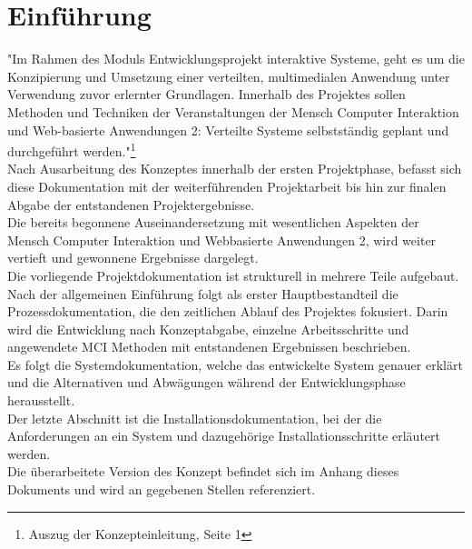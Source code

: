 
\chapter{Einführung}
"Im Rahmen des Moduls Entwicklungsprojekt interaktive Systeme, geht es um die Konzipierung und Umsetzung einer verteilten, multimedialen Anwendung unter Verwendung zuvor erlernter Grundlagen. Innerhalb des Projektes sollen Methoden und Techniken der Veranstaltungen der Mensch Computer Interaktion und Web-basierte Anwendungen 2: Verteilte Systeme selbstständig geplant und durchgeführt werden."\footnote{Auszug der Konzepteinleitung, Seite 1}\\

Nach Ausarbeitung des Konzeptes innerhalb der ersten Projektphase, befasst sich diese Dokumentation mit der weiterführenden Projektarbeit bis hin zur finalen Abgabe der entstandenen Projektergebnisse.\\
Die bereits begonnene Auseinandersetzung mit wesentlichen Aspekten der Mensch Computer Interaktion und Webbasierte Anwendungen 2, wird weiter vertieft und gewonnene Ergebnisse dargelegt.\\

Die vorliegende Projektdokumentation ist strukturell in mehrere Teile aufgebaut.\\
Nach der allgemeinen Einführung folgt als erster Hauptbestandteil die Prozessdokumentation, die den zeitlichen Ablauf des Projektes fokusiert. 
Darin wird die Entwicklung nach Konzeptabgabe, einzelne Arbeitsschritte und angewendete MCI Methoden mit entstandenen Ergebnissen beschrieben.\\ Es folgt die Systemdokumentation, welche das entwickelte System genauer erklärt und die Alternativen und Abwägungen während der Entwicklungsphase herausstellt.\\ 
Der letzte Abschnitt ist die Installationsdokumentation, bei der die Anforderungen an ein System und dazugehörige Installationsschritte erläutert werden.\\

Die überarbeitete Version des Konzept befindet sich im Anhang dieses Dokuments und wird an gegebenen Stellen referenziert.

